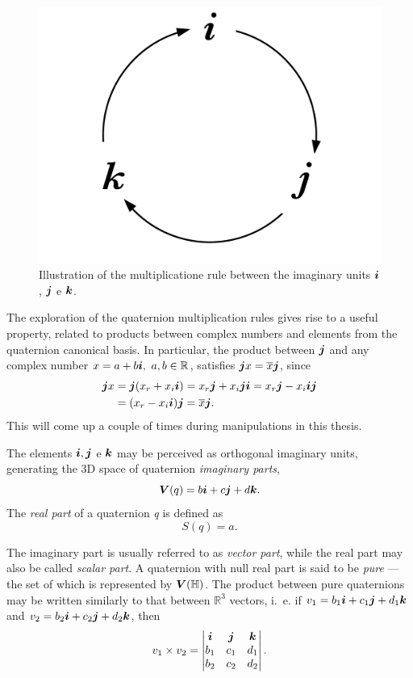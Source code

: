 \begin{figure}
	\centering
	\includegraphics[width=0.2\linewidth]{Figures/quaternion_multiplication.pdf}
	\caption{Illustration of the multiplicatione rule between the imaginary units $ \boldsymbol{i} $, $ \boldsymbol{j} $ e $ \boldsymbol{k} $.}
	\label{fig:quatmult}
\end{figure}

The exploration of the quaternion multiplication rules gives rise to a useful property, related to products between complex numbers and elements from the quaternion canonical basis. In particular, the product between $\boldsymbol{j}$ and any complex number $x = a + b \boldsymbol{i} , \ a, b \in \mathbb{R}$, satisfies $\boldsymbol{j} x = \overline{x} \boldsymbol{j}$, since
\begin{equation}
\label{eq:commutej}
\begin{aligned}
\boldsymbol{j} x &= \boldsymbol{j} (x_r + x_i \boldsymbol{i}) = x_r \boldsymbol{j} + x_i \boldsymbol{j} \boldsymbol{i} = x_r \boldsymbol{j} - x_i \boldsymbol{i} \boldsymbol{j} \\
&= (x_r - x_i \boldsymbol{i}) \boldsymbol{j} = \overline{x} \boldsymbol{j}.
\end{aligned}
\end{equation}
This will come up a couple of times during manipulations in this thesis.

The elements $\boldsymbol{i}, \boldsymbol{j}$ e $\boldsymbol{k}$ may be perceived as orthogonal imaginary units, generating the 3D space of quaternion \textit{imaginary parts},
\begin{equation}
\boldsymbol{V} (q) = b\boldsymbol{i} + c\boldsymbol{j} + d\boldsymbol{k}.
\end{equation}
The \emph{real part} of a quaternion \emph{q} is defined as
\begin{equation}
S(q) = a.
\end{equation}

The imaginary part is usually referred to as \textit{vector part}, while the real part may also be called \textit{scalar part}. A quaternion with null real part is said to be \textit{pure} --- the set of which is represented by $\boldsymbol{V}(\mathbb{H})$. The product between pure quaternions may be written similarly to that between $\mathbb{R}^3$ vectors, i.~e. if $v_1 = b_1\boldsymbol{i} + c_1\boldsymbol{j} + d_1\boldsymbol{k}$ and $v_2 = b_2\boldsymbol{i} + c_2\boldsymbol{j} + d_2\boldsymbol{k}$, then
\begin{equation}
v_1 \times v_2 = 
\begin{vmatrix}
\boldsymbol{i} & \boldsymbol{j} & \boldsymbol{k}\\ 
b_1 & c_1 & d_1\\ 
b_2 & c_2 & d_2
\end{vmatrix}.
\end{equation}

